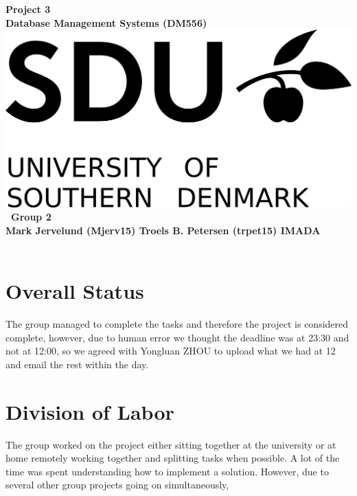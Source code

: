 \documentclass[a4paper,10pt,titlepage]{report}
\date{}
\begin{document}
\begin{titlepage}
\centering
    \vspace*{9\baselineskip}
    \huge
    \bfseries
    Project 3\\
    
    \normalfont 
	\huge    
    Database Management Systems (DM556)  \\[4\baselineskip]
    \normalfont
	\includegraphics[scale=1.5]{SDU_Logo}
    \vfill\
    Group 2\\
    Mark Jervelund (Mjerv15)    Troels B. Petersen (trpet15)
    \vspace{5mm}
    IMADA \\
    \textbf{\datedate} \\[2\baselineskip]
\end{titlepage}

\setcounter{page}{1}
\renewcommand{\thepage}{\arabic{page}}

\lstset{language=Java}          %
\section{Overall Status}
The group managed to complete the tasks and therefore the project is considered complete, however, due to human error we thought the deadline was at 23:30 and not at 12:00, so we agreed with Yongluan ZHOU to upload what we had at 12 and email the rest within the day.
\section{Division of Labor}
The group worked on the project either sitting together at the university or at home remotely working together and splitting tasks when possible. A lot of the time was spent understanding how to implement a solution. However, due to several other group projects going on simultaneously, 
\end{document}
